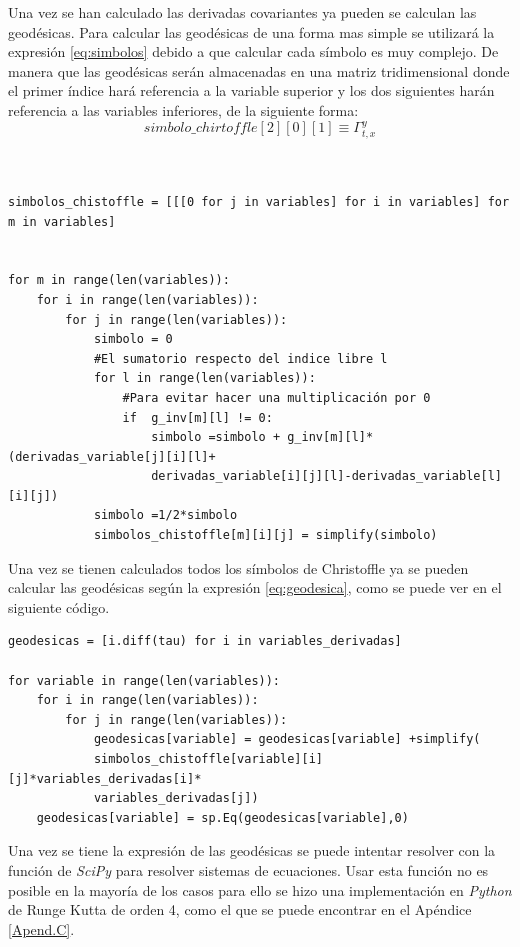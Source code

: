 \documentclass[pdftex,11pt,a4paper]{book}
\begin{document}
Una vez se han calculado las derivadas covariantes ya pueden se calculan las geodésicas. Para calcular las geodésicas de una forma mas simple se utilizará la expresión \ref{eq:simbolos} debido a que calcular cada símbolo es muy complejo. De manera que las geodésicas serán almacenadas en una matriz tridimensional donde el primer índice hará referencia a la variable superior y los dos siguientes harán referencia a las variables inferiores, de la siguiente forma: 
$$
simbolo\_chirtoffle[2][0][1] \equiv \Gamma^y_{t,x}
$$

\begin{verbatim}


simbolos_chistoffle = [[[0 for j in variables] for i in variables] for m in variables]


for m in range(len(variables)):
    for i in range(len(variables)):
        for j in range(len(variables)):
            simbolo = 0
            #El sumatorio respecto del indice libre l 
            for l in range(len(variables)):
                #Para evitar hacer una multiplicación por 0 
                if  g_inv[m][l] != 0: 
                    simbolo =simbolo + g_inv[m][l]*(derivadas_variable[j][i][l]+
                    derivadas_variable[i][j][l]-derivadas_variable[l][i][j])
            simbolo =1/2*simbolo
            simbolos_chistoffle[m][i][j] = simplify(simbolo)
\end{verbatim}

Una vez se tienen calculados todos los símbolos de Christoffle ya se pueden calcular las geodésicas según la expresión \eqref{eq:geodesica}, como se puede ver en el siguiente código. 

\begin{verbatim}
geodesicas = [i.diff(tau) for i in variables_derivadas]

for variable in range(len(variables)): 
    for i in range(len(variables)):
        for j in range(len(variables)):
            geodesicas[variable] = geodesicas[variable] +simplify(
            simbolos_chistoffle[variable][i][j]*variables_derivadas[i]*
            variables_derivadas[j])
    geodesicas[variable] = sp.Eq(geodesicas[variable],0)
\end{verbatim}

Una vez se tiene la expresión de las geodésicas se puede intentar resolver con la función de \textit{SciPy} para resolver sistemas de ecuaciones. Usar esta función no es posible en la mayoría de los casos para ello se hizo una implementación en \textit{Python} de Runge Kutta de orden 4, como el que se puede encontrar en el Apéndice \ref{Apend.C}.
\end{document}
